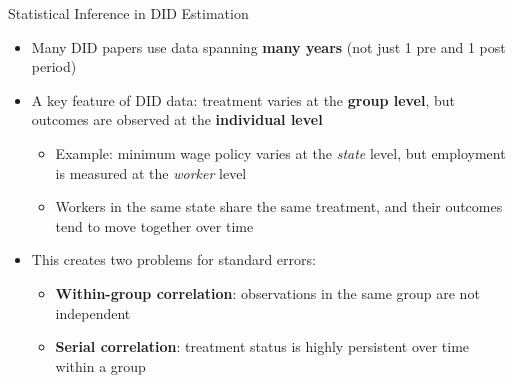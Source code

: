 \documentclass[dvipsnames,hyperref={pdfpagelabels=false}]{beamer}
\begin{document}
\begin{frame}{Statistical Inference in DID Estimation}{}
    \begin{itemize}
        \item Many DID papers use data spanning \textbf{many years} (not just 1 pre and 1 post period)
        \vspace{0.2cm}
        \item A key feature of DID data: treatment varies at the \textbf{group level}, but outcomes are observed at the \textbf{individual level}
        \vspace{0.2cm}
        \begin{itemize}
            \item Example: minimum wage policy varies at the \emph{state} level, but employment is measured at the \emph{worker} level
            \vspace{0.2cm}
            \item Workers in the same state share the same treatment, and their outcomes tend to move together over time
        \end{itemize}
        \vspace{0.2cm}
        \item This creates two problems for standard errors:
        \vspace{0.2cm}
        \begin{itemize}
            \item \textbf{Within-group correlation}: observations in the same group are not independent
            \vspace{0.2cm}
            \item \textbf{Serial correlation}: treatment status is highly persistent over time within a group
        \end{itemize}
    \end{itemize}
\end{frame}
\end{document}
